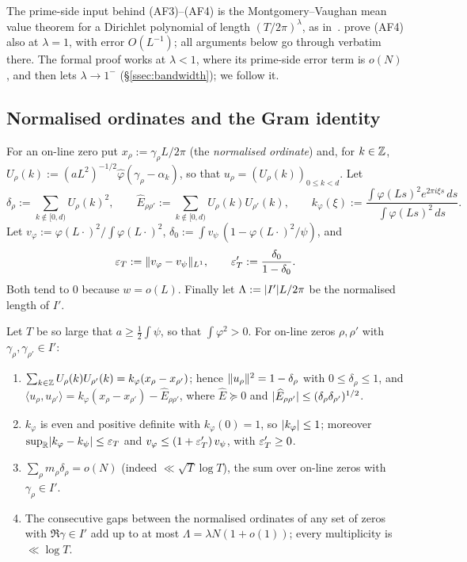 The prime-side input behind (AF3)--(AF4) is the Montgomery--Vaughan mean value theorem for a Dirichlet polynomial of length
$(T/2\pi)^\lambda$, as in~\cite{AF}.
\cite{AF} prove (AF4) also at $\lambda=1$, with error $O(L^{-1})$; all arguments below go through verbatim there. The formal proof works at
$\lambda<1$, where its prime-side error term is $o(N)$, and then lets $\lambda\to1^-$ (\S\ref{ssec:bandwidth}); we follow it.

\subsection{Normalised ordinates and the Gram identity}\label{ssec:gram}
For an on-line zero put $x_\rho:=\gamma_\rho L/2\pi$ (the \emph{normalised ordinate}) and, for $k\in\mathbb Z$,
$U_\rho(k):=(aL^2)^{-1/2}\widehat\varphi(\gamma_\rho-\alpha_k)$, so that $u_\rho=(U_\rho(k))_{0\le k<d}$. Let
\[
\delta_\rho:=\sum_{k\notin[0,d)}U_\rho(k)^2,\qquad \widehat E_{\rho\rho'}:=\sum_{k\notin[0,d)}U_\rho(k)U_{\rho'}(k),\qquad
k_\varphi(\xi):=\frac{\int\varphi(Ls)^2e^{2\pi i\xi s}\,ds}{\int\varphi(Ls)^2\,ds}.
\]
Let $v_\varphi:=\varphi(L\cdot)^2/\!\int\varphi(L\cdot)^2$, $\delta_0:=\int v_\psi\,(1-\varphi(L\cdot)^2/\psi)$, and
\[
\varepsilon_T:=\lVert v_\varphi-v_\psi\rVert_{L^1},\qquad \varepsilon_T':=\frac{\delta_0}{1-\delta_0}.
\]
Both tend to $0$ because $w=o(L)$. Finally let $\Lambda:=\lvert I'\rvert L/2\pi$ be the normalised length of $I'$.

\begin{lemma}\label{lem:residue}
Let $T$ be so large that $a\ge\frac12\int\psi$, so that $\int\varphi^2>0$. For on-line zeros $\rho,\rho'$ with $\gamma_\rho,\gamma_{\rho'}\in I'$:
\begin{enumerate}[label=\textup{(\roman*)}]
\item $\sum_{k\in\mathbb Z}U_\rho(k)U_{\rho'}(k)=k_\varphi(x_\rho-x_{\rho'})$; hence $\lVert u_\rho\rVert^2=1-\delta_\rho$ with $0\le\delta_\rho\le1$, and
$\langle u_\rho,u_{\rho'}\rangle=k_\varphi(x_\rho-x_{\rho'})-\widehat E_{\rho\rho'}$, where $\widehat E\succeq0$ and
$\lvert \widehat E_{\rho\rho'}\rvert\le(\delta_\rho\delta_{\rho'})^{1/2}$.
\item $k_\varphi$ is even and positive definite with $k_\varphi(0)=1$, so $\lvert k_\varphi\rvert\le1$; moreover $\sup_\mathbb R\lvert k_\varphi-k_\psi\rvert\le\varepsilon_T$
and $v_\varphi\le(1+\varepsilon'_T)\,v_\psi$, with $\varepsilon_T'\ge0$.
\item $\sum_{\rho}m_\rho\delta_\rho=o(N)$ \textup{(}indeed $\ll\sqrt T\log T$\textup{)}, the sum over on-line zeros with $\gamma_\rho\in I'$.
\item The consecutive gaps between the normalised ordinates of any set of zeros with $\Re\gamma\in I'$ add up to at most
$\Lambda=\lambda N(1+o(1))$; every multiplicity is $\ll\log T$.
\end{enumerate}
\end{lemma}


